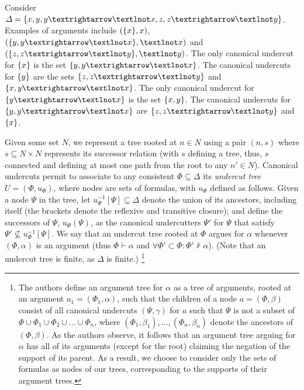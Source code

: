 \documentclass[version=3.21, pagesize, twoside=off, bibliography=totoc, DIV=calc, fontsize=12pt, a4paper, french, english]{scrartcl}
\begin{document}
\begin{example}
	\label{ex:abstract}
	Consider $\Delta = \set{x, y, y → ¬x, z, z → ¬y}$. Examples of arguments include $(\{x\}, x)$, $(\set{y, y → ¬x}, ¬x)$ and $(\set{z, z → ¬y}, ¬y)$. 
	The only canonical undercut for $\{x\}$ is the set $\set{y, y → ¬x}$. 
	The canonical undercuts for $\{y\}$ are the sets $\set{z, z → ¬y}$ and $\set{x, y → ¬x}$. 
	The only canonical undercut for $\set{y → ¬x}$ is the set $\{x, y\}$. 
	The canonical undercuts for $\set{y, y → ¬x}$ are $\set{z, z → ¬y}$ and $\{x\}$.
\end{example}

Given some set $N$, we represent a tree rooted at $n \in N$ using a pair $(n, s)$ where $s \subseteq N × N$ represents its successor relation (with $s$ defining a tree, thus, $s$ connected and defining at most one path from the root to any $n' \in N$). 
Canonical undercuts permit to associate to any consistent $\Phi \subseteq \Delta$ its \emph{undercut tree} $U = (\Phi, u_\Phi)$, where nodes are sets of formulas, with $u_\Phi$ defined as follows. 
Given a node $\Psi$ in the tree, let $u_\Phi^{-1}[\Psi] \subseteq \Delta$ denote the union of its ancestors, including itself (the brackets denote the reflexive and transitive closure); and define the successors of $\Psi$, $u_\Phi(\Psi)$, as the canonical undercutters $\Psi'$ for $\Psi$ that satisfy $\Psi' \nsubseteq u_\Phi^{-1}[\Psi]$.
We say that an undercut tree rooted at $\Phi$ argues for $\alpha$ whenever $(\Phi, \alpha)$ is an argument (thus $\Phi ⊢ \alpha$ and $\forall \Phi' \subset \Phi: \Phi' ⊬ \alpha$).
(Note that an undercut tree is finite, as $\Delta$ is finite.)
\footnote{The authors define an argument tree for $\alpha$ as a tree of arguments, rooted at an argument $a_1 = (\Phi_1, \alpha)$, such that the children of a node $a = (\Phi, \beta)$ consist of all canonical undercuts $(\Psi, \gamma)$ for $a$ such that $\Psi$ is not a subset of $\Phi \cup \Phi_1 \cup \Phi_2 \cup … \cup \Phi_n$, where $(Φ_1, \beta_1), …, (Φ_n, \beta_n)$ denote the ancestors of $(\Phi, \beta)$.
As the authors observe, it follows that an argument tree arguing for $\alpha$ has all of its arguments (except for the root) claiming the negation of the support of its parent. As a result, we choose to consider only the sets of formulas as nodes of our trees, corresponding to the supports of their argument trees.
}
\end{document}
